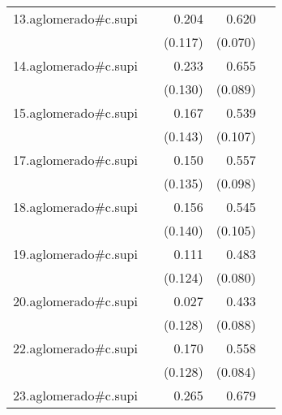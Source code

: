 {\begin{longtable}{l*{4}{D{.}{.}{-1}}}
\addlinespace
13.aglomerado#c.supi&                     &       0.204         &       0.620\sym{***}&                     \\
            &                     &     (0.117)         &     (0.070)         &                     \\
\addlinespace
14.aglomerado#c.supi&                     &       0.233         &       0.655\sym{***}&                     \\
            &                     &     (0.130)         &     (0.089)         &                     \\
\addlinespace
15.aglomerado#c.supi&                     &       0.167         &       0.539\sym{***}&                     \\
            &                     &     (0.143)         &     (0.107)         &                     \\
\addlinespace
17.aglomerado#c.supi&                     &       0.150         &       0.557\sym{***}&                     \\
            &                     &     (0.135)         &     (0.098)         &                     \\
\addlinespace
18.aglomerado#c.supi&                     &       0.156         &       0.545\sym{***}&                     \\
            &                     &     (0.140)         &     (0.105)         &                     \\
\addlinespace
19.aglomerado#c.supi&                     &       0.111         &       0.483\sym{***}&                     \\
            &                     &     (0.124)         &     (0.080)         &                     \\
\addlinespace
20.aglomerado#c.supi&                     &       0.027         &       0.433\sym{***}&                     \\
            &                     &     (0.128)         &     (0.088)         &                     \\
\addlinespace
22.aglomerado#c.supi&                     &       0.170         &       0.558\sym{***}&                     \\
            &                     &     (0.128)         &     (0.084)         &                     \\
\addlinespace
23.aglomerado#c.supi&                     &       0.265\sym{*}  &       0.679\sym{***}&                     \\

\end{longtable}}
